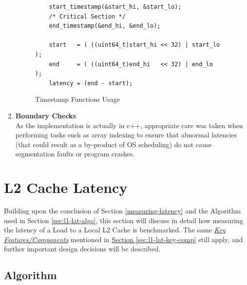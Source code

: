 \documentclass[bsc,frontabs,twoside,singlespacing,parskip,deptreport]{infthesis}     %
\begin{document}
\begin{enumerate}
{\begin{figure}[h!]
\begin{verbatim}
    start_timestamp(&start_hi, &start_lo);
    /* Critical Section */
    end_timestamp(&end_hi, &end_lo);  
    
    start   = ( ((uint64_t)start_hi << 32) | start_lo );
    end     = ( ((uint64_t)end_hi   << 32) | end_lo   );
    latency = (end - start);
        \end{verbatim}
        \caption{Timestamp Functions Usage}
        \label{fig:timestamp_usage_l1}
    \end{figure}
    
    }
    \item{{\bf Boundary Checks} \\
    As the implementation is actually in c++, appropriate care was taken when performing tasks such as array indexing to ensure that abnormal latencies (that could result as a by-product of OS scheduling) do not cause segmentation faults or program crashes. }
\end{enumerate}



\newpage

\section{L2 Cache Latency}\label{sec:l2-cache-latency}
Building upon the conclusion of Section \ref{measuring-latency} and the Algorithm used in Section \ref{sec:l1-lat-algo}, this section will discuss in detail how measuring the latency of a Load to a Local L2 Cache is benchmarked. The same \hyperref[sec:l1-lat-key-comp]{\emph{Key Features/Components}} mentioned in \hyperref[measuring-latency]{Section \ref{sec:l1-lat-key-comp}} still apply, and further important design decisions will be described.

\subsection{Algorithm}\label{sec:l2-lat-algo}
\end{document}
